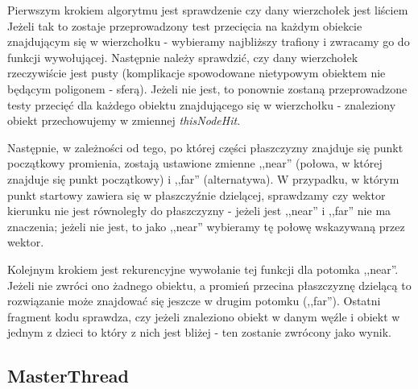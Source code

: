 Pierwszym krokiem algorytmu jest sprawdzenie czy dany wierzchołek jest liściem Jeżeli tak to zostaje przeprowadzony test przecięcia na każdym obiekcie znajdującym się w wierzchołku - wybieramy najbliższy trafiony i zwracamy go do funkcji wywołującej. Następnie należy sprawdzić, czy dany wierzchołek rzeczywiście jest pusty (komplikacje spowodowane nietypowym obiektem nie będącym poligonem - sferą). Jeżeli nie jest, to ponownie zostaną przeprowadzone testy przecięć dla każdego obiektu znajdującego się w wierzchołku - znaleziony obiekt przechowujemy w zmiennej \emph{thisNodeHit}.

Następnie, w zależności od tego, po której części płaszczyzny znajduje się punkt początkowy promienia, zostają ustawione zmienne ,,near'' (połowa, w której znajduje się punkt początkowy) i ,,far'' (alternatywa). W przypadku, w którym punkt startowy zawiera się w płaszczyźnie dzielącej, sprawdzamy czy wektor kierunku nie jest równoległy do płaszczyzny - jeżeli jest ,,near'' i ,,far'' nie ma znaczenia; jeżeli nie jest, to jako ,,near'' wybieramy tę połowę wskazywaną przez wektor.

Kolejnym krokiem jest rekurencyjne wywołanie tej funkcji dla potomka ,,near''. Jeżeli nie zwróci ono żadnego obiektu, a promień przecina płaszczyznę dzielącą to rozwiązanie może znajdować się jeszcze w drugim potomku (,,far''). Ostatni fragment kodu sprawdza, czy jeżeli znaleziono obiekt w danym węźle i obiekt w jednym z dzieci to który z nich jest bliżej - ten zostanie zwrócony jako wynik.

\subsection{MasterThread}
	
